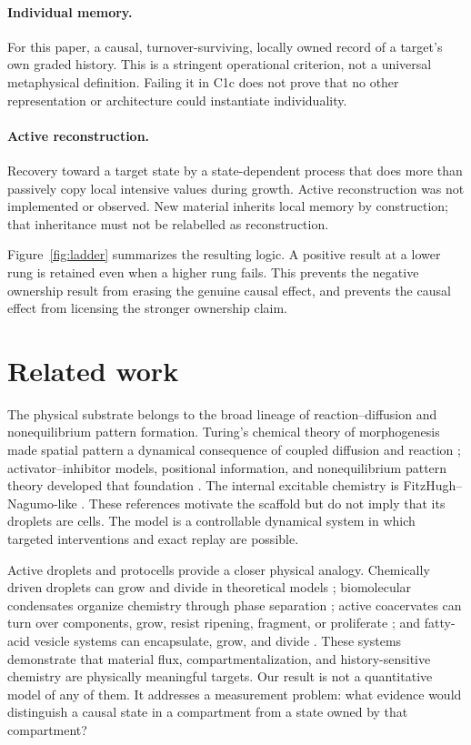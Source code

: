 \documentclass[11pt]{article}
\begin{document}
\paragraph{Individual memory.}
For this paper, a causal, turnover-surviving, locally owned record of a target's own graded history. This is a stringent operational criterion, not a universal metaphysical definition. Failing it in C1c does not prove that no other representation or architecture could instantiate individuality.

\paragraph{Active reconstruction.}
Recovery toward a target state by a state-dependent process that does more than passively copy local intensive values during growth. Active reconstruction was not implemented or observed. New material inherits local memory by construction; that inheritance must not be relabelled as reconstruction.

Figure~\ref{fig:ladder} summarizes the resulting logic. A positive result at a lower rung is retained even when a higher rung fails. This prevents the negative ownership result from erasing the genuine causal effect, and prevents the causal effect from licensing the stronger ownership claim.

\section{Related work}

The physical substrate belongs to the broad lineage of reaction--diffusion and nonequilibrium pattern formation. Turing's chemical theory of morphogenesis made spatial pattern a dynamical consequence of coupled diffusion and reaction \citep{turing1952}; activator--inhibitor models, positional information, and nonequilibrium pattern theory developed that foundation \citep{gierer1972,wolpert1969,cross1993}. The internal excitable chemistry is FitzHugh--Nagumo-like \citep{fitzhugh1961,nagumo1962}. These references motivate the scaffold but do not imply that its droplets are cells. The model is a controllable dynamical system in which targeted interventions and exact replay are possible.

Active droplets and protocells provide a closer physical analogy. Chemically driven droplets can grow and divide in theoretical models \citep{zwicker2017}; biomolecular condensates organize chemistry through phase separation \citep{brangwynne2009,hyman2014,banani2017}; active coacervates can turn over components, grow, resist ripening, fragment, or proliferate \citep{donau2020,nakashima2021,matsuo2021}; and fatty-acid vesicle systems can encapsulate, grow, and divide \citep{hanczyc2003}. These systems demonstrate that material flux, compartmentalization, and history-sensitive chemistry are physically meaningful targets. Our result is not a quantitative model of any of them. It addresses a measurement problem: what evidence would distinguish a causal state in a compartment from a state owned by that compartment?
\end{document}
